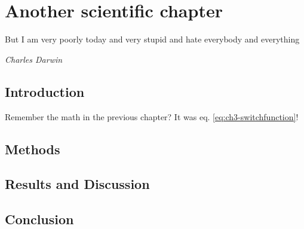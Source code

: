 \cleardoubleevenemptypage
\chapter{Another scientific chapter}
\label{ch:anothe-name}
\pgfmathsetmacro\chapclr{\colourarray[4]}
\hypersetup{
  citecolor  = \chapclr,
  linkcolor  = \chapclr,
  urlcolor   = \chapclr,
}

\epigraph{
  But I am very poorly today and very stupid and hate everybody and everything
}{
  \textit{Charles Darwin}
}

\begin{center}
  \begin{minipage}{\abstractwidth\textwidth}
    \begin{small}
      \lipsum[1]
    \end{small}
  \end{minipage}
  \vspace{0.5cm}
\end{center}

\clearpage

\section{Introduction}
Remember the math in the previous chapter? It was eq. \ref{eq:ch3-switchfunction}!

\blindtext[1]

\section{Methods}
\blindtext[1]
\blindenumerate
\blindtext[1]

\section{Results and Discussion}
\blindtext[3]


\section{Conclusion}
\lipsum[2]